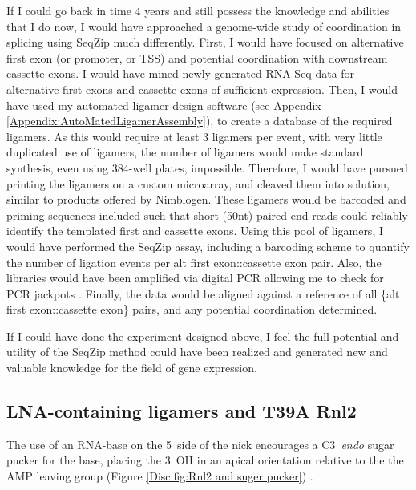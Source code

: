     If I could go back in time 4 years and still possess the knowledge and abilities that I do now, I would have approached a genome-wide study of coordination in splicing using SeqZip much differently. First, I would have focused on alternative first exon (or promoter, or TSS) and potential coordination with downstream cassette exons. I would have mined newly-generated RNA-Seq data \citep{Wang2008, Pan2008} for alternative first exons and cassette exons of sufficient expression. Then, I would have used my automated ligamer design software (see Appendix \ref{Appendix:AutoMatedLigamerAssembly}), to create a database of the required ligamers. As this would require at least 3 ligamers per event, with very little duplicated use of ligamers, the number of ligamers would make standard synthesis, even using 384-well plates, impossible. Therefore, I would have pursued printing the ligamers on a custom microarray, and cleaved them into solution, similar to products offered by \href{http://www.nimblegen.com/}{Nimblogen}. These ligamers would be barcoded and priming sequences included such that short (50nt) paired-end reads could reliably identify the templated first and cassette exons. Using this pool of ligamers, I would have performed the SeqZip assay, including a barcoding scheme to quantify the number of ligation events per {alt first exon::cassette exon} pair. Also, the libraries would have been amplified via digital PCR allowing me to check for PCR jackpots \citep{Shiroguchi2012a}. Finally, the data would be aligned against a reference of all \{alt first exon::cassette exon\} pairs, and any potential coordination determined.

    If I could have done the experiment designed above, I feel the full potential and utility of the SeqZip method could have been realized and generated new and valuable knowledge for the field of gene expression.

  \subsection{LNA-containing ligamers and T39A Rnl2}
    \label{Disc:subsec:LNA-Containing ligamers and T39A Rnk2}

    The use of an RNA-base on the 5\textprime~side of the nick encourages a C3\textprime~\textit{endo} sugar pucker for the base, placing the 3\textprime~OH in an apical orientation relative to the the AMP leaving group (Figure \ref{Disc:fig:Rnl2 and suger pucker}) \citep{Nandakumar2006}.

